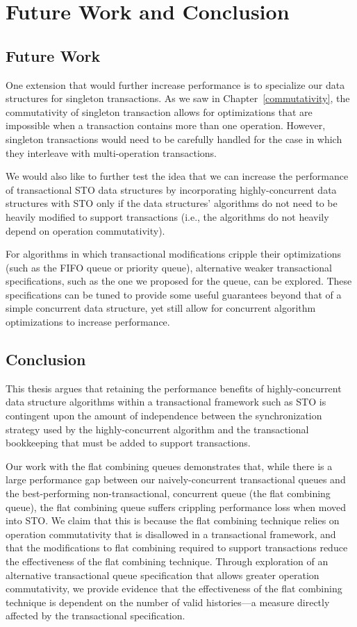 \chapter{Future Work and Conclusion}

\section{Future Work}
One extension that would further increase performance is to specialize our data structures for singleton transactions. As we saw in Chapter~\ref{commutativity}, the commutativity of singleton transaction allows for optimizations that are impossible when a transaction contains more than one operation. However, singleton transactions would need to be carefully handled for the case in which they interleave with multi-operation transactions. 

We would also like to further test the idea that we can increase the performance of transactional STO data structures by incorporating highly-concurrent data structures with STO only if the data structures' algorithms do not need to be heavily modified to support transactions (i.e., the algorithms do not heavily depend on operation commutativity).

For algorithms in which transactional modifications cripple their optimizations (such as the FIFO queue or priority queue), alternative weaker transactional specifications, such as the one we proposed for the queue, can be explored. These specifications can be tuned to provide some useful guarantees beyond that of a simple concurrent data structure, yet still allow for concurrent algorithm optimizations to increase performance.

\section{Conclusion}
This thesis argues that retaining the performance benefits of highly-concurrent data structure algorithms within a transactional framework such as STO is contingent upon the amount of independence between the synchronization strategy used by the highly-concurrent algorithm and the transactional bookkeeping that must be added to support transactions.

Our work with the flat combining queues demonstrates that, while there is a large performance gap between our naively-concurrent transactional queues and the best-performing non-transactional, concurrent queue (the flat combining queue), the flat combining queue suffers crippling performance loss when moved into STO. We claim that this is because the flat combining technique relies on operation commutativity that is disallowed in a transactional framework, and that the modifications to flat combining required to support transactions reduce the effectiveness of the flat combining technique. Through exploration of an alternative transactional queue specification that allows greater operation commutativity, we provide evidence that the effectiveness of the flat combining technique is dependent on the number of valid histories---a measure directly affected by the transactional specification.

